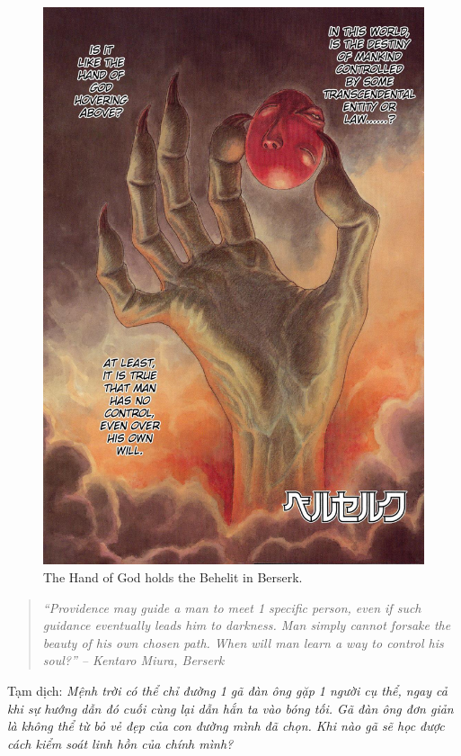 \documentclass[12pt]{article}
\begin{document}
\begin{figure}[H]
	\centering
	\includegraphics[scale=.2]{Berserk_behelit_color}
	\caption{The Hand of God holds the Behelit in Berserk.}
\end{figure}

\begin{quotation}\it
	``Providence may guide a man to meet 1 specific person, even if such guidance eventually leads him to darkness. Man simply cannot forsake the beauty of his own chosen path. When will man learn a way to control his soul?'' – {\sc Kentaro Miura}, {\it Berserk}
\end{quotation}
Tạm dịch: {\it Mệnh trời có thể chỉ đường 1 gã đàn ông gặp 1 người cụ thể, ngay cả khi sự hướng dẫn đó cuối cùng lại dẫn hắn ta vào bóng tối. Gã đàn ông đơn giản là không thể từ bỏ vẻ đẹp của con đường mình đã chọn. Khi nào gã sẽ học được cách kiểm soát linh hồn của chính mình?}
	
\end{document}
